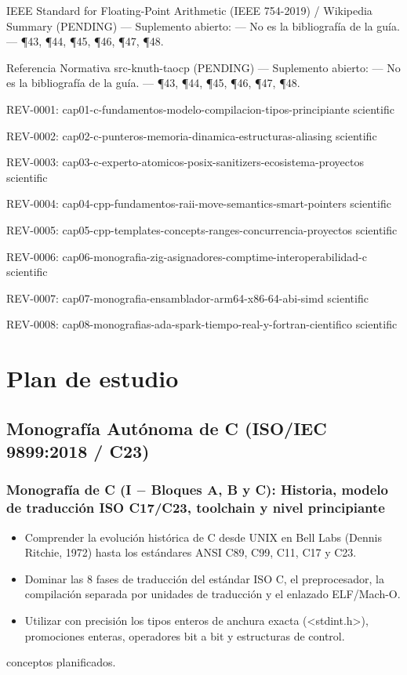 \documentclass{book}
\begin{document}
\noindent IEEE Standard for Floating-Point Arithmetic (IEEE 754-2019) / Wikipedia Summary (PENDING) --- Suplemento abierto: --- No es la bibliografía de la guía. --- \P43, \P44, \P45, \P46, \P47, \P48.

\noindent Referencia Normativa src-knuth-taocp (PENDING) --- Suplemento abierto: --- No es la bibliografía de la guía. --- \P43, \P44, \P45, \P46, \P47, \P48.

\noindent REV-0001: cap01-c-fundamentos-modelo-compilacion-tipos-principiante scientific

\noindent REV-0002: cap02-c-punteros-memoria-dinamica-estructuras-aliasing scientific

\noindent REV-0003: cap03-c-experto-atomicos-posix-sanitizers-ecosistema-proyectos scientific

\noindent REV-0004: cap04-cpp-fundamentos-raii-move-semantics-smart-pointers scientific

\noindent REV-0005: cap05-cpp-templates-concepts-ranges-concurrencia-proyectos scientific

\noindent REV-0006: cap06-monografia-zig-asignadores-comptime-interoperabilidad-c scientific

\noindent REV-0007: cap07-monografia-ensamblador-arm64-x86-64-abi-simd scientific

\noindent REV-0008: cap08-monografias-ada-spark-tiempo-real-y-fortran-cientifico scientific
\chapter{Plan de estudio}

\section*{Monografía Autónoma de C (ISO/IEC 9899:2018 / C23)}

\subsection*{\checkmark Monografía de C (I \(-\) Bloques A, B y C): Historia, modelo de traducción ISO C17/C23, toolchain y nivel principiante}
\begin{itemize}
\item Comprender la evolución histórica de C desde UNIX en Bell Labs (Dennis Ritchie, 1972) hasta los estándares ANSI C89, C99, C11, C17 y C23.
\item Dominar las 8 fases de traducción del estándar ISO C, el preprocesador, la compilación separada por unidades de traducción y el enlazado ELF/Mach-O.
\item Utilizar con precisión los tipos enteros de anchura exacta (<stdint.h>), promociones enteras, operadores bit a bit y estructuras de control.
\end{itemize}
 conceptos planificados.
\end{document}
